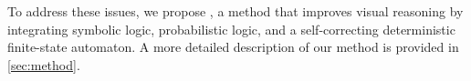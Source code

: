 To address these issues, we propose \methodname{}, a method that improves visual reasoning by integrating symbolic logic, probabilistic logic, and a self-correcting deterministic finite-state automaton. A more detailed description of our method is provided in \autoref{sec:method}.

